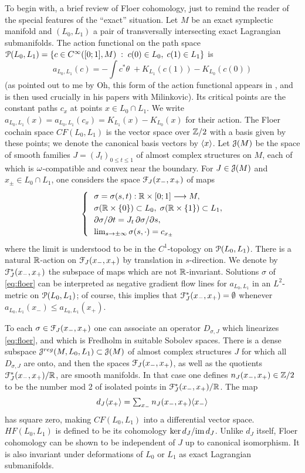 \documentclass[10pt,letterpaper]{article}
\begin{document}
To begin with, a brief review of Floer cohomology, just to remind the
reader of the special features of the ``exact'' situation. Let $M$ be
an exact symplectic manifold and $(L_0,L_1)$ a pair of transversally
intersecting exact Lagrangian submanifolds. The action functional on
the path space $\mathcal{P}(L_0,L_1) = \{c \in C^\infty([0;1], M) \; : \;
c(0) \in L_0, \; c(1) \in L_1 \}$ is
\[
a_{L_0,L_1}(c) = -\!\int c^*\theta \;+ K_{L_1}(c(1)) - K_{L_0}(c(0))
\]
(as pointed out to me by Oh, this form of the action functional
appears in \cite{ohnew}, and is then used crucially in his papers
with Milinkovic). Its critical points are the constant paths $c_x$ at
points $x \in L_0 \cap L_1$. We write $a_{L_0,L_1}(x) =
a_{L_0,L_1}(c_x) = K_{L_1}(x) - K_{L_0}(x)$ for their action. The
Floer cochain space $CF(L_0,L_1)$ is the vector space over $\mathbb{Z}/2$
with a basis given by these points; we denote the canonical basis
vectors by $\langle x \rangle$. Let $\mathcal{J}(M)$ be the space of smooth families $J
= (J_t)_{0 \leq t \leq 1}$ of almost complex structures on $M$, each
of which is $\omega$-compatible and convex near the boundary. For $J \in
\mathcal{J}(M)$ and $x_{\pm} \in L_0 \cap L_1$, one considers the space
$\mathcal{F}_J(x_-,x_+)$ of maps
\begin{equation} \label{eq:floer}
\begin{cases}
 & \!\! \sigma = \sigma(s,t): \R \times [0;1] \longrightarrow M, \\
 & \!\! \sigma(\R \times \{0\}) \subset L_0, \;
 \sigma(\R \times \{1\}) \subset L_1, \\
 & \!\! \partial \sigma/\partial t = J_t \,\partial \sigma/\partial s, \\
 & \!\! \lim_{s \rightarrow \pm \infty} \sigma(s,\cdot) = c_{x_{\pm}}
\end{cases}
\end{equation}
where the limit is understood to be in the $C^1$-topology on $\mathcal{P}(L_0,L_1)$.
There is a natural $\mathbb{R}$-action on $\mathcal{F}_J(x_-,x_+)$ by translation in
$s$-direction. We denote by $\mathcal{F}_J^*(x_-,x_+)$ the subspace of maps which are
not $\mathbb{R}$-invariant. Solutions $\sigma$ of \eqref{eq:floer} can be interpreted
as negative gradient flow lines for $a_{L_0,L_1}$ in an $L^2$-metric on
$\mathcal{P}(L_0,L_1)$; of course, this implies that $\mathcal{F}_J^*(x_-,x_+) = \emptyset$
whenever $a_{L_0,L_1}(x_-) \leq a_{L_0,L_1}(x_+)$.

To each $\sigma \in \mathcal{F}_J(x_-,x_+)$ one can associate an operator
$D_{\sigma,J}$ which linearizes \eqref{eq:floer}, and which is Fredholm in
suitable Sobolev spaces. There is a dense subspace $\mathcal{J}^{reg}(M,L_0,L_1)
\subset \mathcal{J}(M)$ of almost complex structures $J$ for which all $D_{\sigma,J}$
are onto, and then the spaces $\mathcal{F}_J(x_-,x_+)$, as well as the quotients
$\mathcal{F}_J^*(x_-,x_+)/\mathbb{R}$, are smooth manifolds. In that case one defines
$n_J(x_-,x_+) \in \mathbb{Z}/2$ to be the number mod 2 of isolated points in
$\mathcal{F}_J^*(x_-,x_+)/\mathbb{R}$. The map
\[
d_J\langle x_+ \rangle = \textstyle \sum_{x_-} n_J(x_-,x_+) \langle x_- \rangle
\]
has square zero, making $CF(L_0,L_1)$ into a differential vector space.
$HF(L_0,L_1)$ is defined to be its cohomology $\mathrm{ker}\, d_J/\mathrm{im}\, d_J$. Unlike
$d_J$ itself, Floer cohomology can be shown to be independent of $J$ up to
canonical isomorphism. It is also invariant under deformations of $L_0$ or
$L_1$ as exact Lagrangian submanifolds.
\end{document}
